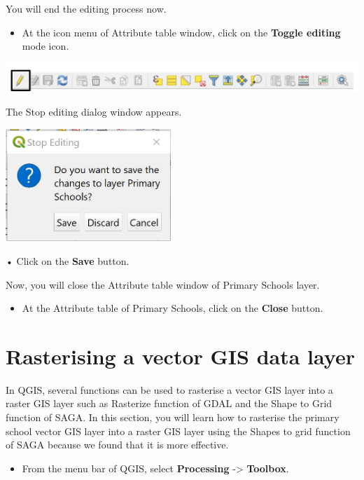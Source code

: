 \documentclass[
  letterpaper,
  DIV=11,
  numbers=noendperiod]{scrreprt}
\providecommand{\tightlist}{%
  \setlength{\itemsep}{0pt}\setlength{\parskip}{0pt}}\usepackage{longtable,booktabs,array}
\begin{document}
You will end the editing process now.

\begin{itemize}
\tightlist
\item
  At the icon menu of Attribute table window, click on the
  \textbf{Toggle editing} mode icon.
\end{itemize}

\includegraphics{./img06/image5.jpg}

The Stop editing dialog window appears.

\includegraphics[width=2.45833in,height=\textheight]{./img06/image6.jpg}

• Click on the \textbf{Save} button.

Now, you will close the Attribute table window of Primary Schools layer.

\begin{itemize}
\tightlist
\item
  At the Attribute table of Primary Schools, click on the \textbf{Close}
  button.
\end{itemize}

\hypertarget{rasterising-a-vector-gis-data-layer}{%
\section{Rasterising a vector GIS data
layer}\label{rasterising-a-vector-gis-data-layer}}

In QGIS, several functions can be used to rasterise a vector GIS layer
into a raster GIS layer such as Rasterize function of GDAL and the Shape
to Grid function of SAGA. In this section, you will learn how to
rasterise the primary school vector GIS layer into a raster GIS layer
using the Shapes to grid function of SAGA because we found that it is
more effective.

\begin{itemize}
\tightlist
\item
  From the menu bar of QGIS, select \textbf{Processing} -\textgreater{}
  \textbf{Toolbox}.
\end{itemize}
\end{document}

